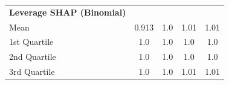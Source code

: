 {\begin{tabular} {lcccc}
\addlinespace[1ex]
\textbf{Leverage SHAP (Binomial)} &  &  &  &  \\
\hspace{7pt}Mean & \cellcolor{gold!60}0.913 & \cellcolor{gold!60}1.0 & \cellcolor{silver!60}1.01 & \cellcolor{silver!60}1.01 \\
\hspace{7pt}1st Quartile & \cellcolor{gold!60}1.0 & \cellcolor{silver!60}1.0 & \cellcolor{silver!60}1.0 & \cellcolor{silver!60}1.0 \\
\hspace{7pt}2nd Quartile & \cellcolor{silver!60}1.0 & \cellcolor{gold!60}1.0 & \cellcolor{silver!60}1.0 & \cellcolor{gold!60}1.0 \\
\hspace{7pt}3rd Quartile & \cellcolor{gold!60}1.0 & \cellcolor{silver!60}1.0 & \cellcolor{gold!60}1.01 & \cellcolor{silver!60}1.01 \\
\bottomrule
\end{tabular}}
